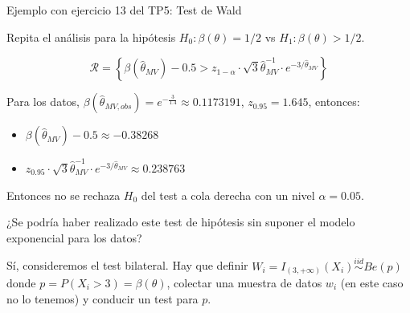 \documentclass{beamer}
\theoremstyle{definition}
\begin{document}
\begin{frame}{\color{rosee}Ejemplo con ejercicio 13 del TP5: Test de Wald}\small


 Repita el análisis para la hipótesis $H_0: \beta(\theta)=1/2$ vs $H_1: \beta(\theta)> 1/2$.
 
 \color{gray}
\[\mathcal{R}=\left\{\beta(\widehat{\theta}_{MV})-0.5>z_{1-\alpha}\cdot \sqrt{3}\widehat{\theta}_{MV}^{-1}\cdot e^{-3/\widehat{\theta}_{MV}}\right\}\]

Para los datos, $\beta(\widehat{\theta}_{MV,obs})=e^{-\frac{3}{1.4}}\approx 0.1173191$, $z_{0.95}=1.645$, entonces:
\begin{itemize}
    \item $\beta(\widehat{\theta}_{MV})-0.5\approx -0.38268$
    \item $z_{0.95}\cdot \sqrt{3}\widehat{\theta}_{MV}^{-1}\cdot e^{-3/\widehat{\theta}_{MV}}\approx 0.238763$
\end{itemize}
Entonces no se rechaza $H_0$ del test a cola derecha con un nivel $\alpha=0.05$.

\color{black}

  \vspace{10pt}
  
  ¿Se podría haber realizado este test de hipótesis sin suponer el modelo exponencial para los datos?
  
\color{gray}

\vspace{10pt}

  Sí, consideremos el test bilateral. Hay que definir $W_i=I_{(3,+\infty)}(X_i)\stackrel{iid}{\sim}Be(p)$ donde $p=P(X_i>3)=\beta(\theta)$, colectar una muestra de datos $w_i$ (en este caso no lo tenemos) y conducir un test para $p$.
  
  
\end{frame}

    
    
\end{document}
